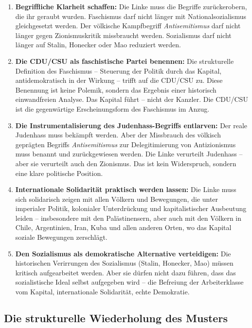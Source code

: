 \begin{enumerate}
    \item \textbf{Begriffliche Klarheit schaffen:} Die Linke muss die Begriffe zurückerobern, die ihr geraubt wurden. Faschismus darf nicht länger mit Nationalsozialismus gleichgesetzt werden. Der völkische Kampfbegriff \emph{Antisemitismus} darf nicht länger gegen Zionismuskritik missbraucht werden. Sozialismus darf nicht länger auf Stalin, Honecker oder Mao reduziert werden.
    
    \item \textbf{Die CDU/CSU als faschistische Partei benennen:} Die strukturelle Definition des Faschismus -- Steuerung der Politik durch das Kapital, antidemokratisch in der Wirkung -- trifft auf die CDU/CSU zu. Diese Benennung ist keine Polemik, sondern das Ergebnis einer historisch einwandfreien Analyse. Das Kapital führt -- nicht der Kanzler. Die CDU/CSU ist die gegenwärtige Erscheinungsform des Faschismus im Anzug.
    
    \item \textbf{Die Instrumentalisierung des Judenhass-Begriffs entlarven:} Der reale Judenhass muss bekämpft werden. Aber der Missbrauch des völkisch geprägten Begriffs \emph{Antisemitismus} zur Delegitimierung von Antizionismus muss benannt und zurückgewiesen werden. Die Linke verurteilt Judenhass -- aber sie verurteilt auch den Zionismus. Das ist kein Widerspruch, sondern eine klare politische Position.
    
    \item \textbf{Internationale Solidarität praktisch werden lassen:} Die Linke muss sich solidarisch zeigen mit allen Völkern und Bewegungen, die unter imperialer Politik, kolonialer Unterdrückung und kapitalistischer Ausbeutung leiden -- insbesondere mit den Palästinensern, aber auch mit den Völkern in Chile, Argentinien, Iran, Kuba und allen anderen Orten, wo das Kapital soziale Bewegungen zerschlägt.
    
    \item \textbf{Den Sozialismus als demokratische Alternative verteidigen:} Die historischen Verirrungen des Sozialismus (Stalin, Honecker, Mao) müssen kritisch aufgearbeitet werden. Aber sie dürfen nicht dazu führen, dass das sozialistische Ideal selbst aufgegeben wird -- die Befreiung der Arbeiterklasse vom Kapital, internationale Solidarität, echte Demokratie.
\end{enumerate}

\subsection{Die strukturelle Wiederholung des Musters}

